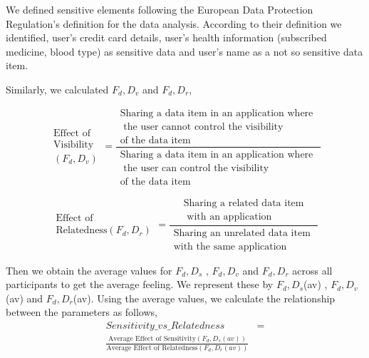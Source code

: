 \documentclass[10pt]{article}
\begin{document}
We defined sensitive elements following the European Data Protection Regulation's definition for the data analysis. According to their definition we identified, user's credit card details, user's health information (subscribed medicine, blood type) as sensitive data and user's name as a not so sensitive data item. 

Similarly, we calculated $F_d,D_v$ and $F_d,D_r$,

\[ \begin{aligned} \text{Effect of } \\ \text{Visibility}\\ (F_{d},D_{v}) \end{aligned} =
\frac{\begin{aligned}
      \text{Sharing a data item in an application where } \\ \text{ the user cannot control the visibility} \\ \text{of the data item}
      \end{aligned}}%
 {\begin{aligned}
       \text{Sharing a data item in an application where } \\ \text{ the user can control the visibility} \\ \text{of the data item}
      \end{aligned}}
\]



\[ \begin{aligned} \text{Effect of } \\ \text{Relatedness}(F_{d},D_{r})\end{aligned} =
\frac{\begin{aligned}
      \text{Sharing a related data item} \\ \text{  with an application}
      \end{aligned}}%
 {\begin{aligned}
      \text{Sharing an unrelated data item }\\ \text{with the same application}
      \end{aligned}}
\]

Then we obtain the average values for $F_d,D_s$ , $F_d,D_v$ and $F_d,D_r$ across all participants to get the average feeling. We represent these by $F_d,D_s$(av) , $F_d,D_v$(av) and $F_d,D_r$(av). Using the average values, we calculate the relationship between the parameters as follows,
 \begin{equation} \label{eq1}
\begin{split}
Sensitivity\_vs\_Relatedness & = \\ \frac{\text{Average Effect of Sensitivity}(F_{d},D_{s}(av)) }{\text{Average Effect of Relatedness}(F_{d},D_{r}(av))} 
\end{split}
\end{equation}
\end{document}
